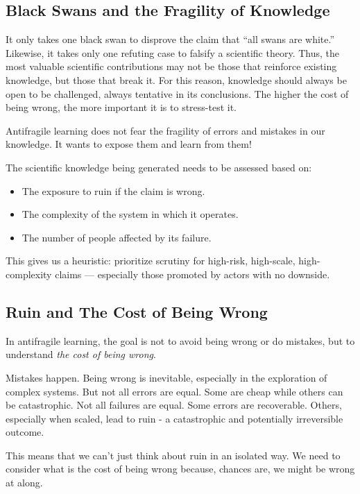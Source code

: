 \subsection{Black Swans and the Fragility of Knowledge}

It only takes one black swan to disprove the claim that “all swans are white.” Likewise, it takes only one refuting case to falsify a scientific theory. Thus, the most valuable scientific contributions may not be those that reinforce existing knowledge, but those that break it. For this reason, knowledge should always be open to be challenged, always tentative in its conclusions. The higher the cost of being wrong, the more important it is to stress-test it.

Antifragile learning does not fear the fragility of errors and mistakes in our knowledge. It wants to expose them and learn from them!

The scientific knowledge being generated needs to be assessed based on:
\begin{itemize}
	\item The exposure to ruin if the claim is wrong.
	\item The complexity of the system in which it operates.
	\item The number of people affected by its failure.
\end{itemize}

This gives us a heuristic: prioritize scrutiny for high-risk, high-scale, high-complexity claims — especially those promoted by actors with no downside.

\subsection{Ruin and The Cost of Being Wrong}

In antifragile learning, the goal is not to avoid being wrong or do mistakes, but to understand \emph{the cost of being wrong}.

Mistakes happen. Being wrong is inevitable, especially in the exploration of complex systems. But not all errors are equal. Some are cheap while others can be catastrophic. Not all failures are equal. Some errors are recoverable. Others, especially when scaled, lead to ruin - a catastrophic and potentially irreversible outcome.

This means that we can't just think about ruin in an isolated way. We need to consider what is the cost of being wrong because, chances are, we might be wrong at along.

